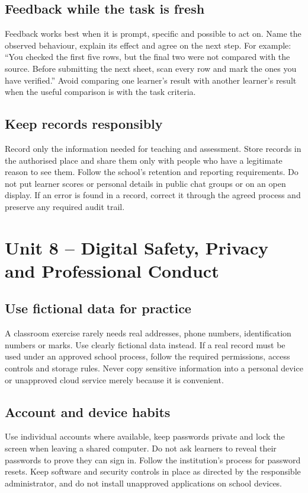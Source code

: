 \documentclass[11pt,openany,oneside]{book}
\begin{document}
\section{Feedback while the task is fresh}
Feedback works best when it is prompt, specific and possible to act on. Name the observed behaviour, explain its effect and agree on the next step. For example: “You checked the first five rows, but the final two were not compared with the source. Before submitting the next sheet, scan every row and mark the ones you have verified.” Avoid comparing one learner's result with another learner's result when the useful comparison is with the task criteria.
\section{Keep records responsibly}
Record only the information needed for teaching and assessment. Store records in the authorised place and share them only with people who have a legitimate reason to see them. Follow the school's retention and reporting requirements. Do not put learner scores or personal details in public chat groups or on an open display. If an error is found in a record, correct it through the agreed process and preserve any required audit trail.

\chapter{Unit 8 -- Digital Safety, Privacy and Professional Conduct}
\section{Use fictional data for practice}
A classroom exercise rarely needs real addresses, phone numbers, identification numbers or marks. Use clearly fictional data instead. If a real record must be used under an approved school process, follow the required permissions, access controls and storage rules. Never copy sensitive information into a personal device or unapproved cloud service merely because it is convenient.
\section{Account and device habits}
Use individual accounts where available, keep passwords private and lock the screen when leaving a shared computer. Do not ask learners to reveal their passwords to prove they can sign in. Follow the institution's process for password resets. Keep software and security controls in place as directed by the responsible administrator, and do not install unapproved applications on school devices.
\end{document}

